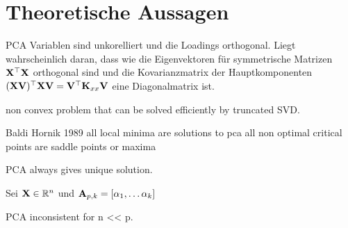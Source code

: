 \section{Theoretische Aussagen}
\label{pca_theorems}

PCA Variablen sind unkorelliert und die Loadings orthogonal. Liegt wahrscheinlich daran, dass wie die Eigenvektoren für symmetrische Matrizen $\mathbf{X}^{\top}\mathbf{X}$ orthogonal sind und die Kovarianzmatrix der Hauptkomponenten $(\mathbf{X} \mathbf{V})^{\top}\mathbf{X} \mathbf{V} = \mathbf{V}^{\top}\mathbf{K}_{xx} \mathbf{V}$ eine Diagonalmatrix ist.

non convex problem that can be solved efficiently by truncated SVD.

Baldi Hornik 1989
all local minima are solutions to pca
all non optimal critical points are saddle points or maxima

\begin{thm}
PCA always gives unique solution.
\end{thm}

\begin{thm}
Sei $\mathbf{X} \in \mathbb{R}^n$ und $\mathbf{A}_{p,k} = [\alpha_1, \ldots \alpha_k] $   
\end{thm}

\begin{thm}
PCA inconsistent for n << p.
\end{thm}


